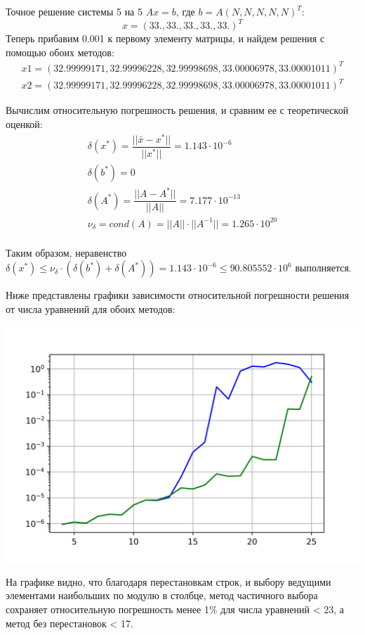 \documentclass[a4paper,12pt]{report} %
\begin{document}
Точное решение системы 5 на 5 $Ax = b$, где $b = A(N, N, N, N, N)^T$:
\[
	x = (33., 33., 33., 33. , 33.)^T
\]
Теперь прибавим 0.001 к первому элементу матрицы, и найдем решения с помощью обоих методов:
\begin{gather*}
	x1 = (32.99999171, 32.99996228, 32.99998698, 33.00006978, 33.00001011)^T \\
	x2 = (32.99999171, 32.99996228, 32.99998698, 33.00006978, 33.00001011)^T
\end{gather*}

Вычислим относительную погрешность решения, и сравним ее с теоретической оценкой:
\begin{gather*}
	\delta(x^*) = \dfrac{|| \bar{x} - x^*||}{||x^*||} = 1.143\cdot 10^{-6} \\
	\delta(b^*) = 0 \\
	\delta(A^*) = \dfrac{|| A - A^*||}{||A||} = 7.177 \cdot 10^{-13}\\
	\nu_{\delta} = cond(A) = ||A|| \cdot ||A^{-1}|| = 1.265 \cdot 10^{20}\\
\end{gather*}

Таким образом, неравенство $\delta(x^*) \leq \nu_{\delta} \cdot (\delta(b^*) + \delta(A^*)) = 1.143\cdot 10^{-6} \leq 90.805552 \cdot 10^6$ выполняется.

Ниже представлены графики зависимости относительной погрешности решения от числа уравнений для обоих методов:

\noindent\includegraphics{3.1_plot.png}

На графике видно, что благодаря перестановкам строк, и выбору ведущими элементами наибольших по модулю в столбце,
метод частичного выбора сохраняет относительную погрешность менее 1\% для числа уравнений < 23, а метод без перестановок < 17.
\end{document}
